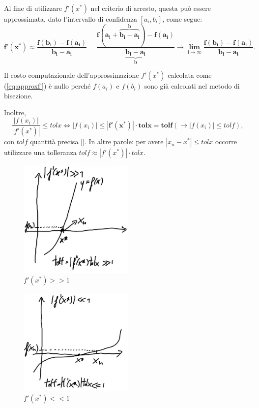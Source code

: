 Al fine di utilizzare $f'(x^*)$ nel criterio di arresto, questa può essere approssimata, dato l'intervallo di confidenza $[a_i, b_i]$, come segue:
\begin{equation}\label{eq:approxf'}
	\boldsymbol{f'(x^*)\approx\frac{f(b_i)-f(a_i)}{b_i-a_i}=\frac{f(a_i+\overbrace{b_i-a_i}^{h})-f(a_i)}{\underbrace{b_i-a_i}_{h}}\rightarrow \lim_{i\to\infty}\frac{f(b_i)-f(a_i)}{b_i-a_i}}.
\end{equation}

\begin{remark}
	Il costo computazionale dell'approssimazione $f'(x^*)$ calcolata come (\ref{eq:approxf'}) è nullo perché $f(a_i)$ e $f(b_i)$ sono già calcolati nel metodo di bisezione.
\end{remark}

Inoltre,
\begin{equation*}
	\frac{|f(x_i)|}{|f'(x^*)|}\leq tolx \iff |f(x_i)|\leq \boldsymbol{|f'(x^*)|\cdot tolx=tolf}(\rightarrow |f(x_i)|\leq tolf),
\end{equation*}
con ${tolf}$ quantità precisa [\footnotemark]. In altre parole: per avere $|x_n-x^*|\leq tolx$ occorre utilizzare una tolleranza $tolf\approx|f'(x^*)|\cdot tolx$.

\begin{figure}
	\centering
	\includegraphics[width=0.5\textwidth]{immagini/f1(xStar)major1.jpg}
	\caption{\label{fig:f1(xStar)major1.jpg}$f'(x^*)>>1$}
\end{figure}
\begin{figure}
	\centering
	\includegraphics[width=0.5\textwidth]{immagini/f1(xStar)minor1.jpg}
	\caption{\label{fig:f1(xStar)minor1.jpg} $f'(x^*)<<1$}
\end{figure}

